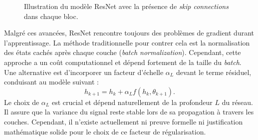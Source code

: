 \begin{figure}[htbp]
    \centering
    \caption{Illustration du modèle ResNet avec la présence de \textit{skip connections} dans chaque bloc.}
    \label{fig:resnet}
\end{figure}

Malgré ces avancées, ResNet rencontre toujours des problèmes de gradient durant l'apprentissage. La méthode traditionnelle pour contrer cela est la normalisation des états cachés après chaque couche (\textit{batch normalization}). Cependant, cette approche a un coût computationnel et dépend fortement de la taille du \textit{batch}. Une alternative est d'incorporer un facteur d'échelle $\alpha_L$ devant le terme résiduel, conduisant au modèle suivant :
\[
    h_{k+1} = h_k + \alpha_L f(h_k, \theta_{k+1})
.\]
Le choix de $\alpha_L$ est crucial et dépend naturellement de la profondeur $L$ du réseau. Il assure que la variance du signal reste stable lors de sa propagation à travers les couches. Cependant, il n'existe actuellement ni preuve formelle ni justification mathématique solide pour le choix de ce facteur de régularisation.

